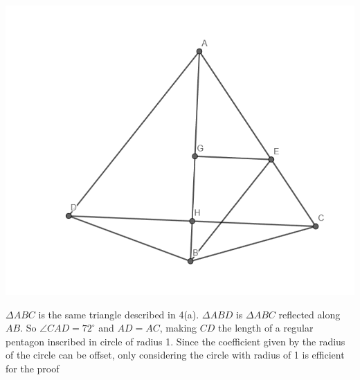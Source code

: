 \documentclass{article}
\begin{document}
~

\includegraphics[scale=0.5]{HW_0214/4c.png}

$\Delta ABC$ is the same triangle described in 4(a). $\Delta ABD$ is $\Delta ABC$ reflected along $AB$. So $\angle CAD=72^\circ$ and $AD=AC$, making $CD$ the length of a regular pentagon inscribed in circle of radius 1. Since the coefficient given by the radius of the circle can be offset, only considering the circle with radius of 1 is efficient for the proof
\end{document}
